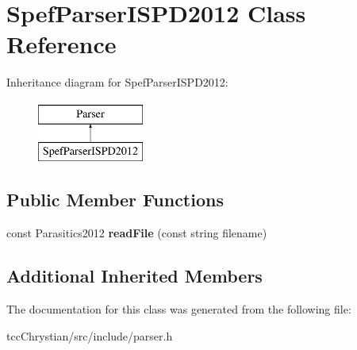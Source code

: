 \hypertarget{classSpefParserISPD2012}{\section{Spef\-Parser\-I\-S\-P\-D2012 Class Reference}
\label{classSpefParserISPD2012}
}
Inheritance diagram for Spef\-Parser\-I\-S\-P\-D2012\-:\begin{figure}[H]
\begin{center}
\leavevmode
\includegraphics[height=2.000000cm]{classSpefParserISPD2012}
\end{center}
\end{figure}
\subsection*{Public Member Functions}
\begin{DoxyCompactItemize}
\item 
\hypertarget{classSpefParserISPD2012_a130209fe17a1d791cd03543304e48d5e}{const Parasitics2012 {\bfseries read\-File} (const string filename)}\label{classSpefParserISPD2012_a130209fe17a1d791cd03543304e48d5e}

\end{DoxyCompactItemize}
\subsection*{Additional Inherited Members}


The documentation for this class was generated from the following file\-:\begin{DoxyCompactItemize}
\item 
tcc\-Chrystian/src/include/parser.\-h\end{DoxyCompactItemize}

